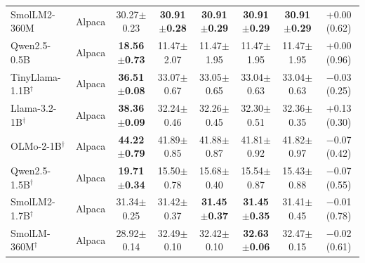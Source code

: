\begin{tabular}{@{}llcccccc@{}}
SmolLM2-360M & Alpaca & 30.27{\scriptsize$\pm$0.23} & \textbf{30.91{\scriptsize$\pm$0.28}} & \textbf{30.91{\scriptsize$\pm$0.29}} & \textbf{30.91{\scriptsize$\pm$0.29}} & \textbf{30.91{\scriptsize$\pm$0.29}} & +0.00 (0.62) \\
Qwen2.5-0.5B & Alpaca & \textbf{18.56{\scriptsize$\pm$0.73}} & 11.47{\scriptsize$\pm$2.07} & 11.47{\scriptsize$\pm$1.95} & 11.47{\scriptsize$\pm$1.95} & 11.47{\scriptsize$\pm$1.95} & +0.00 (0.96) \\
TinyLlama-1.1B$^\dagger$ & Alpaca & \textbf{36.51{\scriptsize$\pm$0.08}} & 33.07{\scriptsize$\pm$0.67} & 33.05{\scriptsize$\pm$0.65} & 33.04{\scriptsize$\pm$0.63} & 33.04{\scriptsize$\pm$0.63} & $-$0.03 (0.25) \\
Llama-3.2-1B$^\dagger$ & Alpaca & \textbf{38.36{\scriptsize$\pm$0.09}} & 32.24{\scriptsize$\pm$0.46} & 32.26{\scriptsize$\pm$0.45} & 32.30{\scriptsize$\pm$0.51} & 32.36{\scriptsize$\pm$0.35} & +0.13 (0.30) \\
OLMo-2-1B$^\dagger$ & Alpaca & \textbf{44.22{\scriptsize$\pm$0.79}} & 41.89{\scriptsize$\pm$0.85} & 41.88{\scriptsize$\pm$0.87} & 41.81{\scriptsize$\pm$0.92} & 41.82{\scriptsize$\pm$0.97} & $-$0.07 (0.42) \\
Qwen2.5-1.5B$^\dagger$ & Alpaca & \textbf{19.71{\scriptsize$\pm$0.34}} & 15.50{\scriptsize$\pm$0.78} & 15.68{\scriptsize$\pm$0.40} & 15.54{\scriptsize$\pm$0.87} & 15.43{\scriptsize$\pm$0.88} & $-$0.07 (0.55) \\
SmolLM2-1.7B$^\dagger$ & Alpaca & 31.34{\scriptsize$\pm$0.25} & 31.42{\scriptsize$\pm$0.37} & \textbf{31.45{\scriptsize$\pm$0.37}} & \textbf{31.45{\scriptsize$\pm$0.35}} & 31.41{\scriptsize$\pm$0.45} & $-$0.01 (0.78) \\
SmolLM-360M$^\dagger$ & Alpaca & 28.92{\scriptsize$\pm$0.14} & 32.49{\scriptsize$\pm$0.10} & 32.42{\scriptsize$\pm$0.10} & \textbf{32.63{\scriptsize$\pm$0.06}} & 32.47{\scriptsize$\pm$0.15} & $-$0.02 (0.61) \\
\bottomrule
\end{tabular}
